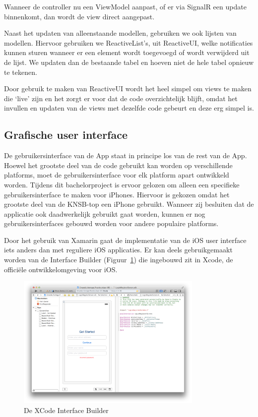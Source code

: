 
Wanneer de controller nu een ViewModel aanpast, of er via SignalR een update binnenkomt, dan wordt de view direct aangepast. 

Naast het updaten van alleenstaande modellen, gebruiken we ook lijsten van modellen. Hiervoor gebruiken we ReactiveList's, uit ReactiveUI, welke notificaties kunnen sturen wanneer er een element wordt toegevoegd of wordt verwijderd uit de lijst. We updaten dan de bestaande tabel en hoeven niet de hele tabel opnieuw te tekenen.

Door gebruik te maken van ReactiveUI wordt het heel simpel om views te maken die `live' zijn en het zorgt er voor dat de code overzichtelijk blijft, omdat het invullen en updaten van de views met dezelfde code gebeurt en deze erg simpel is.

\subsection{Grafische user interface}

De gebruikersinterface van de App staat in principe los van de rest van de App. Hoewel het grootste deel van de code gebruikt kan worden op verschillende platforms, moet de gebruikersinterface voor elk platform apart ontwikkeld worden. Tijdens dit bachelorproject is ervoor gelozen om alleen een specifieke gebruikersinterface te maken voor iPhones. Hiervoor is gekozen omdat het grootste deel van de KNSB-top een iPhone gebruikt. Wanneer zij besluiten dat de applicatie ook daadwerkelijk gebruikt gaat worden, kunnen er nog gebruikersinterfaces gebouwd worden voor andere populaire platforms.

Door het gebruik van Xamarin gaat de implementatie van de iOS user interface iets anders dan met reguliere iOS applicaties. Er kan deels gebruikgemaakt worden van de Interface Builder (Figuur~\ref{fig:interface-builder}) die ingebouwd zit in Xcode, de officiële ontwikkelomgeving voor iOS.

\begin{figure}[h!]
\centering
\includegraphics[width=0.8\textwidth]{style/images/screenshots/InterfaceBuilder}
\caption{De XCode Interface Builder}
\label{fig:interface-builder}
\end{figure}

